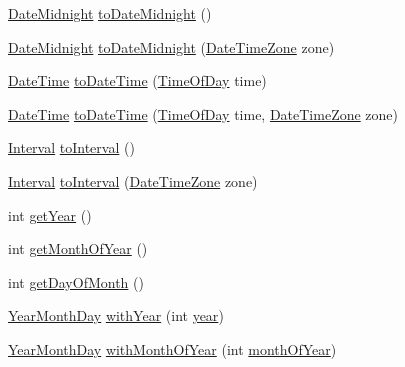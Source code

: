 \begin{DoxyCompactItemize}
\item 
\hyperlink{classorg_1_1joda_1_1time_1_1_date_midnight}{Date\-Midnight} \hyperlink{classorg_1_1joda_1_1time_1_1_year_month_day_a0b2375e3d7e8f6884b95ce5a80731266}{to\-Date\-Midnight} ()
\item 
\hyperlink{classorg_1_1joda_1_1time_1_1_date_midnight}{Date\-Midnight} \hyperlink{classorg_1_1joda_1_1time_1_1_year_month_day_ad2fb4ba467284f58b1dbacbb7309dbac}{to\-Date\-Midnight} (\hyperlink{classorg_1_1joda_1_1time_1_1_date_time_zone}{Date\-Time\-Zone} zone)
\item 
\hyperlink{classorg_1_1joda_1_1time_1_1_date_time}{Date\-Time} \hyperlink{classorg_1_1joda_1_1time_1_1_year_month_day_a8730abf792c6067a57e60bd0c1eee5fc}{to\-Date\-Time} (\hyperlink{classorg_1_1joda_1_1time_1_1_time_of_day}{Time\-Of\-Day} time)
\item 
\hyperlink{classorg_1_1joda_1_1time_1_1_date_time}{Date\-Time} \hyperlink{classorg_1_1joda_1_1time_1_1_year_month_day_aaccc51d67b086d5b607f563559af30d4}{to\-Date\-Time} (\hyperlink{classorg_1_1joda_1_1time_1_1_time_of_day}{Time\-Of\-Day} time, \hyperlink{classorg_1_1joda_1_1time_1_1_date_time_zone}{Date\-Time\-Zone} zone)
\item 
\hyperlink{classorg_1_1joda_1_1time_1_1_interval}{Interval} \hyperlink{classorg_1_1joda_1_1time_1_1_year_month_day_afa8f0b9c133a9f7742bcd5b4388aedf5}{to\-Interval} ()
\item 
\hyperlink{classorg_1_1joda_1_1time_1_1_interval}{Interval} \hyperlink{classorg_1_1joda_1_1time_1_1_year_month_day_ac1b481c8022beedff99abb799098ad7d}{to\-Interval} (\hyperlink{classorg_1_1joda_1_1time_1_1_date_time_zone}{Date\-Time\-Zone} zone)
\item 
int \hyperlink{classorg_1_1joda_1_1time_1_1_year_month_day_a037bcc200af9b4c8c75cf11ec5ff0b74}{get\-Year} ()
\item 
int \hyperlink{classorg_1_1joda_1_1time_1_1_year_month_day_a3715ef40e7f16a3ae95f0ac58f2a5b31}{get\-Month\-Of\-Year} ()
\item 
int \hyperlink{classorg_1_1joda_1_1time_1_1_year_month_day_a54ac0c59a07d177dcb76e8bcf801d95e}{get\-Day\-Of\-Month} ()
\item 
\hyperlink{classorg_1_1joda_1_1time_1_1_year_month_day}{Year\-Month\-Day} \hyperlink{classorg_1_1joda_1_1time_1_1_year_month_day_aaeb4528e5fe1653b85d633c9cf22aa46}{with\-Year} (int \hyperlink{classorg_1_1joda_1_1time_1_1_year_month_day_a0d4c3130ad3599f58c06b44b0cc3bb40}{year})
\item 
\hyperlink{classorg_1_1joda_1_1time_1_1_year_month_day}{Year\-Month\-Day} \hyperlink{classorg_1_1joda_1_1time_1_1_year_month_day_adfb63f902b7b111aeea452abf4500299}{with\-Month\-Of\-Year} (int \hyperlink{classorg_1_1joda_1_1time_1_1_year_month_day_aee12513f0a474e8f9d986f3b3b5c8f82}{month\-Of\-Year})

\end{DoxyCompactItemize}
